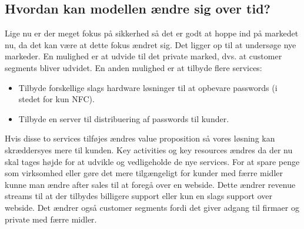 
\subsection{Hvordan kan modellen ændre sig over tid?}
Lige nu er der meget fokus på sikkerhed så det er godt at hoppe ind på markedet nu, da det kan være at dette fokus ændret sig.
Det ligger op til at undersøge nye markeder.
En mulighed er at udvide til det private marked, dvs. at customer segments bliver udvidet.
En anden mulighed er at tilbyde flere services:
\begin{itemize}
\item Tilbyde forskellige slags hardware løsninger til at opbevare passwords (i stedet for kun NFC).
\item Tilbyde en server til distribuering af passwords til kunder.
\end{itemize}
Hvis disse to services tilføjes ændres value proposition så vores løsning kan skræddersyes mere til kunden.
Key activities og key resources ændres da der nu skal tages højde for at udvikle og vedligeholde de nye services.
For at spare penge som virksomhed eller gøre det mere tilgængeligt for kunder med færre midler kunne man ændre after sales til at foregå over en webside.
Dette ændrer revenue streams til at der tilbydes billigere support eller kun en slags support over webside.
Det ændrer også customer segments fordi det giver adgang til firmaer og private med færre midler.